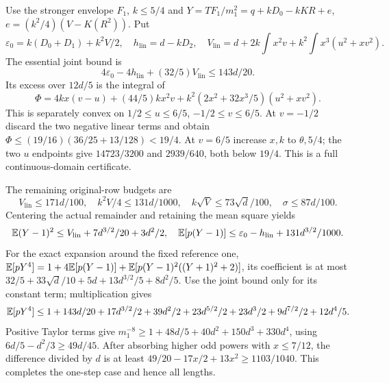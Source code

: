 Use the stronger envelope $F_1$, $k\le5/4$ and
$Y=TF_1/m_1^2=q+kD_0-kKR+e$, $e=(k^2/4)(V-K(R^2))$.
Put
\[
 \varepsilon_0=k(D_0+D_1)+k^2V/2,\quad
 h_{\mathrm{lin}}=d-kD_2,\quad
 V_{\mathrm{lin}}=d+2k\int x^2v+k^2\int x^3(u^2+xv^2).
\]
The essential joint bound is
\[
 4\varepsilon_0-4h_{\mathrm{lin}}+(32/5)V_{\mathrm{lin}}\le143d/20.
\]
Its excess over $12d/5$ is the integral of
\[
 \Phi=4kx(v-u)+(44/5)kx^2v
                 +k^2(2x^2+32x^3/5)(u^2+xv^2).
\]
This is separately convex on $1/2\le u\le6/5$,
$-1/2\le v\le6/5$.
At $v=-1/2$ discard the two negative linear terms and obtain
$\Phi\le(19/16)(36/25+13/128)<19/4$.
At $v=6/5$ increase $x,k$ to $\theta,5/4$; the two $u$ endpoints
give $14723/3200$ and $2939/640$, both below $19/4$.
This is a full continuous-domain certificate.

The remaining original-row budgets are
\[
 V_{\mathrm{lin}}\le171d/100,\quad k^2V/4\le131d/1000,\quad
 k\sqrt V\le73\sqrt d/100,\quad \sigma\le87d/100.
\]
Centering the actual remainder and retaining the mean square yields
\[
 \mathbb E(Y-1)^2\le V_{\mathrm{lin}}+7d^{3/2}/20+3d^2/2,
 \quad\mathbb E[p(Y-1)]\le\varepsilon_0-h_{\mathrm{lin}}+131d^{3/2}/1000.
\]
For the exact expansion around the fixed reference one,
$\mathbb E[pY^4]=1+4\mathbb E[p(Y-1)]+
\mathbb E[p(Y-1)^2((Y+1)^2+2)]$, its coefficient is at most
$32/5+33\sqrt d/10+5d+13d^{3/2}/5+8d^2/5$.
Use the joint bound only for its constant term; multiplication gives
\[
 \mathbb E[pY^4]\le1+143d/20+17d^{3/2}/2+39d^2/2
                  +23d^{5/2}/2+23d^3/2+9d^{7/2}/2+12d^4/5.
\]
Positive Taylor terms give
$m_1^{-8}\ge1+48d/5+40d^2+150d^3+330d^4$,
using $6d/5-d^2/3\ge49d/45$.
After absorbing higher odd powers with $x\le7/12$, the difference
divided by $d$ is at least
$49/20-17x/2+13x^2\ge1103/1040$.
This completes the one-step case and hence all lengths.
